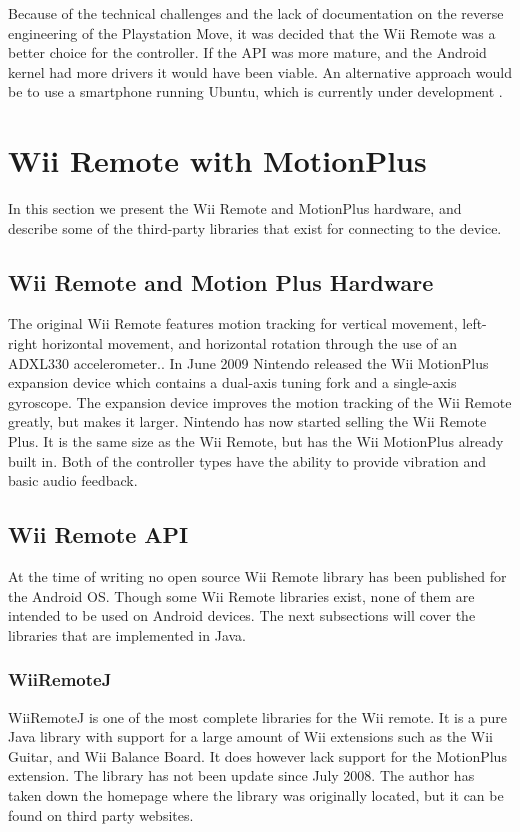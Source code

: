 Because of the technical challenges and the lack of documentation on the reverse engineering of the Playstation Move, it was decided that the Wii Remote was a better choice for the controller. If the API was more mature, and the Android kernel had more drivers it would have been viable. An alternative approach would be to use a smartphone running Ubuntu, which is currently under development \cite{ubuntuAndroid}.

\section{Wii Remote with MotionPlus}
In this section we present the Wii Remote and MotionPlus hardware, and describe some of the third-party libraries that exist for connecting to the device.

\subsection{Wii Remote and Motion Plus Hardware}
The original Wii Remote features motion tracking for vertical movement, left-right horizontal movement, and horizontal rotation through the use of an ADXL330 accelerometer.\cite{wiiAccelerometer}. In June 2009 Nintendo released the Wii MotionPlus expansion device which contains a dual-axis tuning fork and a single-axis gyroscope\cite{wiiMotionPlus}. The expansion device improves the motion tracking of the Wii Remote greatly, but makes it larger. Nintendo has now started selling the Wii Remote Plus. It is the same size as the Wii Remote, but has the Wii MotionPlus already built in. Both of the controller types have the ability to provide vibration and basic audio feedback.

\subsection{Wii Remote API}
At the time of writing no open source Wii Remote library has been published for the Android OS. Though some Wii Remote libraries exist, none of them are intended to be used on Android devices. The next subsections will cover the libraries that are implemented in Java.

\subsubsection{WiiRemoteJ}
WiiRemoteJ is one of the most complete libraries for the Wii remote. It is a pure Java library with support for a large amount of Wii extensions such as the Wii Guitar, and Wii Balance Board. It does however lack support for the MotionPlus extension. The library has not been update since July 2008. The author has taken down the homepage where the library was originally located, but it can be found on third party websites. \cite{WiiRemoteJ}

